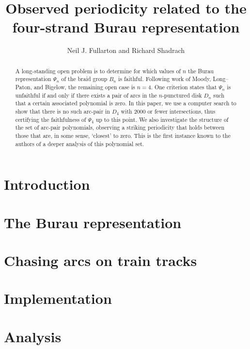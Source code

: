 \documentclass[11 pt,final]{article}
\title{Observed periodicity related to the four-strand Burau representation}
\author{Neil J. Fullarton and Richard Shadrach}
\begin{document}
 \maketitle
 \begin{abstract}
  A long-standing open problem is to determine for which values of $n$ the Burau representation $\Psi_n$ of the braid group $B_n$ is faithful. Following work of Moody, Long--Paton, and Bigelow, the remaining open case is $n=4$. One criterion states that $\Psi_n$ is unfaithful if and only if there exists a pair of arcs in the $n$-punctured disk $D_n$ such that a certain associated polynomial is zero. In this paper, we use a computer search to show that there is no such arc-pair in $D_4$ with 2000 or fewer intersections, thus certifying the faithfulness of $\Psi_4$ up to this point. We also investigate the structure of the set of arc-pair polynomials, observing a striking periodicity that holds between those that are, in some sense, `closest' to zero. This is the first instance known to the authors of a deeper analysis of this polynomial set.
 \end{abstract}

 \section{Introduction}
  
 \section{The Burau representation}
  
 \section{Chasing arcs on train tracks}
  
 \section{Implementation}
  
 \section{Analysis}
  
  
 \newpage



\end{document}
